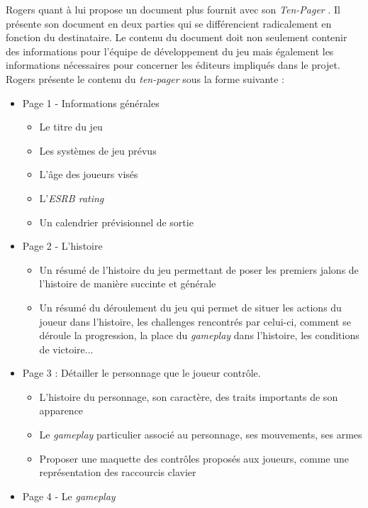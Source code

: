 Rogers \cite{LevelUpRogers2014} quant à lui propose un document plus fournit avec son \emph{\guillemotleft Ten-Pager \guillemotright}. Il présente son document en deux parties qui se différencient radicalement en fonction du destinataire. Le contenu du document doit non seulement contenir des informations pour l'équipe de développement du jeu mais également les informations nécessaires pour concerner les éditeurs impliqués dans le projet. Rogers présente le contenu du \emph{ten-pager} sous la forme suivante :
\begin{itemize}
    \item Page 1 - Informations générales
    \begin{itemize}
        \item Le titre du jeu
        \item Les systèmes de jeu prévus
        \item L'âge des joueurs visés
        \item L'\emph{ESRB rating}
        \item Un calendrier prévisionnel de sortie
    \end{itemize}
    \item Page 2 - L'histoire
    \begin{itemize}
        \item Un résumé de l'histoire du jeu permettant de poser les premiers jalons de l'histoire de manière succinte et générale
        \item Un résumé du déroulement du jeu qui permet de situer les actions du joueur dans l'histoire, les challenges rencontrés par celui-ci, comment se déroule la progression, la place du \emph{gameplay} dans l'histoire, les conditions de victoire...
    \end{itemize}
    \item Page 3 : Détailler le personnage que le joueur contrôle.
    \begin{itemize}
        \item L'histoire du personnage, son caractère, des traits importants de son apparence
        \item Le \emph{gameplay} particulier associé au personnage, ses mouvements, ses armes
        \item Proposer une maquette des contrôles proposés aux joueurs, comme une représentation des raccourcis clavier
    \end{itemize}
    \item Page 4 - Le \emph{gameplay} 
    \begin{itemize}

\end{itemize}
\end{itemize}
